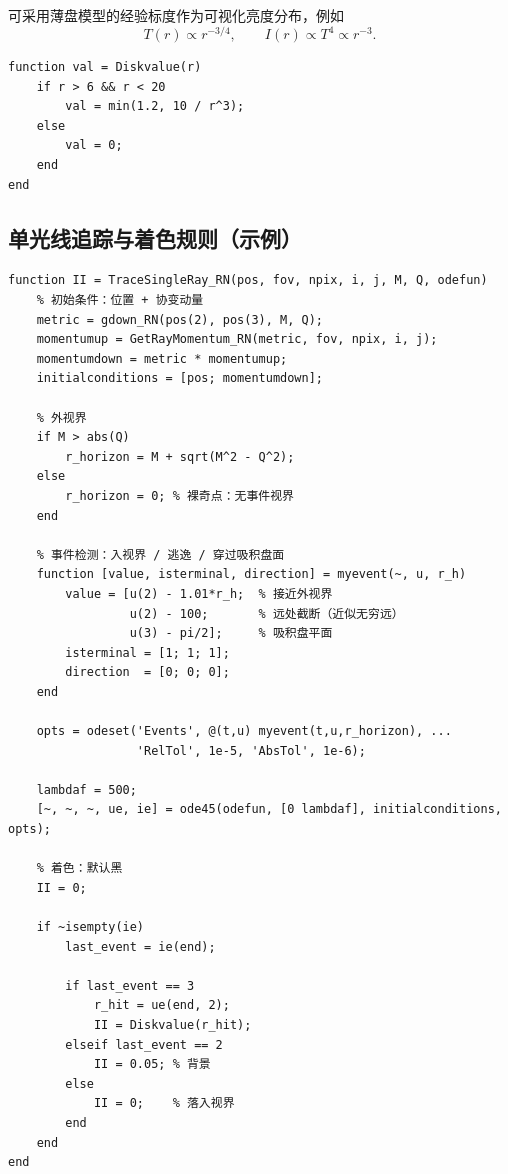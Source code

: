 \documentclass[a4paper,12pt]{article}
\numberwithin{equation}{section}
\begin{document}
可采用薄盘模型的经验标度作为可视化亮度分布，例如
\begin{equation}
T(r)\propto r^{-3/4},\qquad I(r)\propto T^4\propto r^{-3}.
\end{equation}

\begin{lstlisting}[caption={吸积盘亮度函数 \texttt{Diskvalue}}]
function val = Diskvalue(r)
    if r > 6 && r < 20
        val = min(1.2, 10 / r^3);
    else
        val = 0;
    end
end
\end{lstlisting}

\subsection{单光线追踪与着色规则（示例）}

\begin{lstlisting}[caption={单光线追踪 \texttt{TraceSingleRay\_RN}}]
function II = TraceSingleRay_RN(pos, fov, npix, i, j, M, Q, odefun)
    % 初始条件：位置 + 协变动量
    metric = gdown_RN(pos(2), pos(3), M, Q);
    momentumup = GetRayMomentum_RN(metric, fov, npix, i, j);
    momentumdown = metric * momentumup;
    initialconditions = [pos; momentumdown];

    % 外视界
    if M > abs(Q)
        r_horizon = M + sqrt(M^2 - Q^2);
    else
        r_horizon = 0; % 裸奇点：无事件视界
    end

    % 事件检测：入视界 / 逃逸 / 穿过吸积盘面
    function [value, isterminal, direction] = myevent(~, u, r_h)
        value = [u(2) - 1.01*r_h;  % 接近外视界
                 u(2) - 100;       % 远处截断（近似无穷远）
                 u(3) - pi/2];     % 吸积盘平面
        isterminal = [1; 1; 1];
        direction  = [0; 0; 0];
    end

    opts = odeset('Events', @(t,u) myevent(t,u,r_horizon), ...
                  'RelTol', 1e-5, 'AbsTol', 1e-6);

    lambdaf = 500;
    [~, ~, ~, ue, ie] = ode45(odefun, [0 lambdaf], initialconditions, opts);

    % 着色：默认黑
    II = 0;

    if ~isempty(ie)
        last_event = ie(end);

        if last_event == 3
            r_hit = ue(end, 2);
            II = Diskvalue(r_hit);
        elseif last_event == 2
            II = 0.05; % 背景
        else
            II = 0;    % 落入视界
        end
    end
end
\end{lstlisting}
\end{document}
